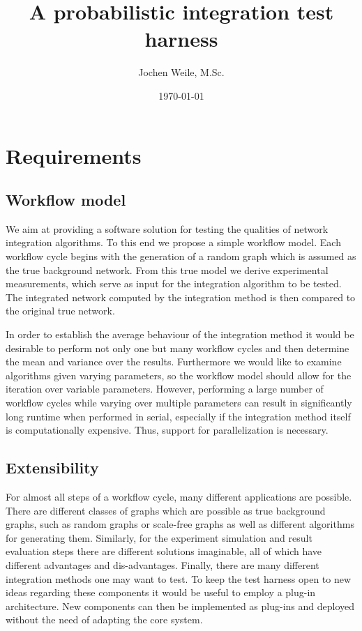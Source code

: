 \documentclass{scrartcl}
\title{A probabilistic integration test harness}
\author{Jochen Weile, M.Sc.}
\date{\today}
\begin{document}
\maketitle

\section{Requirements}
\subsection{Workflow model}

We aim at providing a software solution for testing the qualities of network integration algorithms. To this end we propose a simple workflow model. Each workflow cycle begins with the generation of a random graph which is assumed as the true background network. From this true model we derive experimental measurements, which serve as input for the integration algorithm to be tested. The integrated network computed by the integration method is then compared to the original true network. 

In order to establish the average behaviour of the integration method it would be desirable to perform not only one but many workflow cycles and then determine the mean and variance over the results. Furthermore we would like to examine algorithms given varying parameters, so the workflow model should allow for the iteration over variable parameters. However, performing a large number of workflow cycles while varying over multiple parameters can result in significantly long runtime when performed in serial, especially if the integration method itself is computationally expensive. Thus, support for parallelization is necessary.

\subsection{Extensibility}

For almost all steps of a workflow cycle, many different applications are possible. There are different classes of graphs which are possible as true background graphs, such as random graphs or scale-free graphs as well as different algorithms for generating them. Similarly, for the experiment simulation and result evaluation steps there are different solutions imaginable, all of which have different advantages and dis-advantages. Finally, there are many different integration methods one may want to test. To keep the test harness open to new ideas regarding these components it would be useful to employ a plug-in architecture. New components can then be implemented as plug-ins and deployed without the need of adapting the core system. 
\end{document}

